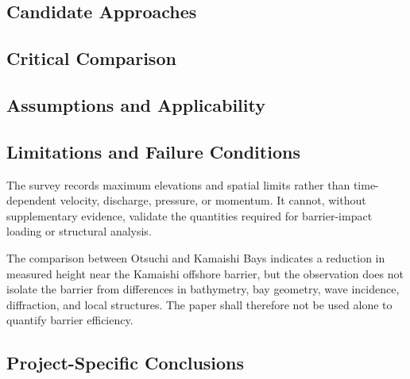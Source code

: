 \subsection{Candidate Approaches}
\label{sec:res-phy-nrs-candidate-approaches}


\subsection{Critical Comparison}
\label{sec:res-phy-nrs-critical-comparison}


\subsection{Assumptions and Applicability}
\label{sec:res-phy-nrs-assumptions}


\subsection{Limitations and Failure Conditions}
\label{sec:res-phy-nrs-limitations}


The survey records maximum elevations and spatial limits rather than time-dependent velocity, discharge, pressure, or momentum. It cannot, without supplementary evidence, validate the quantities required for barrier-impact loading or structural analysis. 

The comparison between Otsuchi and Kamaishi Bays indicates a reduction in measured height near the Kamaishi offshore barrier, but the observation does not isolate the barrier from differences in bathymetry, bay geometry, wave incidence, diffraction, and local structures. The paper shall therefore not be used alone to quantify barrier efficiency.

\subsection{Project-Specific Conclusions}
\label{sec:res-phy-nrs-conclusions}

